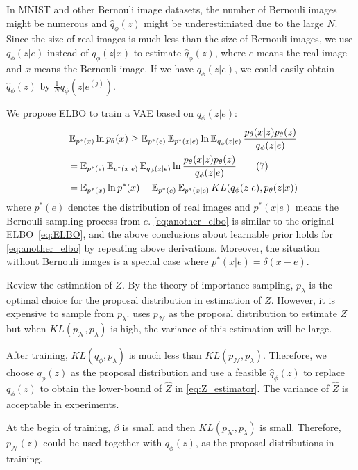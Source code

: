 In MNIST and other Bernouli image datasets, the number of Bernouli images might be numerous and $\hat{q}_\phi(z)$ might be underestimiated due to the large $N$. 
Since the size of real images is much less than the size of Bernouli images, we use $q_\phi(z|e)$ instead of $q_\phi(z|x)$ to estimate $\hat{q}_\phi(z)$, where $e$ means the real image and $x$ means the Bernouli image. If we have $q_\phi(z|e)$, we could easily obtain $\hat{q}_\phi(z)$ by $\frac{1}{N} q_\phi(z|e^{(j)})$. 

We propose ELBO to train a VAE based on $q_\phi(z|e)$:
\begin{align*}~\label{eq:another_elbo}
	&\operatorname{\mathbb{E}}_{p^*(x)} \ln p_\theta(x) \geq \operatorname{\mathbb{E}}_{p^*(e)} \operatorname{\mathbb{E}}_{p^*(x|e)} \ln \operatorname{\mathbb{E}}_{q_\phi(z|e)} \frac{p_\theta(x|z)p_\theta(z)}{q_\phi(z|e)} \\
	 &= \operatorname{\mathbb{E}}_{p^*(e)} \operatorname{\mathbb{E}}_{p^*(x|e)} \operatorname{\mathbb{E}}_{q_\phi(z|e)} \ln \frac{p_\theta(x|z)p_\theta(z)}{q_\phi(z|e)} \tag{7} \\
	 &= \operatorname{\mathbb{E}}_{p^*(x)} \ln p^*(x) - \operatorname{\mathbb{E}}_{p^*(e)} \operatorname{\mathbb{E}}_{p^*(x|e)} KL(q_\phi(z|e), p_\theta(z|x))
\end{align*} 
where $p^*(e)$ denotes the distribution of real images and $p^*(x|e)$ means the Bernouli sampling process from $e$. 
\cref{eq:another_elbo} is similar to the original ELBO~\cref{eq:ELBO}, and the above conclusions about learnable prior holds for \cref{eq:another_elbo} by repeating above derivations. Moreover, the situation without Bernouli images is a special case where $p^*(x|e) = \delta(x - e)$. %

Review the estimation of $Z$. By the theory of importance sampling, $p_\lambda$ is the optimal choice for the proposal distribution in estimation of $Z$. However, it is expensive to sample from $p_\lambda$. 
\cite{bauer2019resampled} uses $p_\mathcal{N}$ as the proposal distribution to estimate $Z$ but when $KL(p_\mathcal{N}, p_\lambda)$ is high, the variance of this estimation will be large. 

After training, $KL(q_\phi, p_\lambda)$ is much less than $KL(p_\mathcal{N}, p_\lambda)$. Therefore, we choose $q_\phi(z)$ as the proposal distribution and use a feasible $\hat{q}_\phi(z)$ to replace $q_\phi(z)$ to obtain the lower-bound of $\hat{Z}$ in \cref{eq:Z_estimator}. The variance of $\hat{Z}$ is acceptable in experiments.  

At the begin of training, $\beta$ is small and then $KL(p_\mathcal{N}, p_\lambda)$ is small. Therefore, $p_\mathcal{N}(z)$ could be used together with $q_\phi(z)$, as the proposal distributions in training.
 